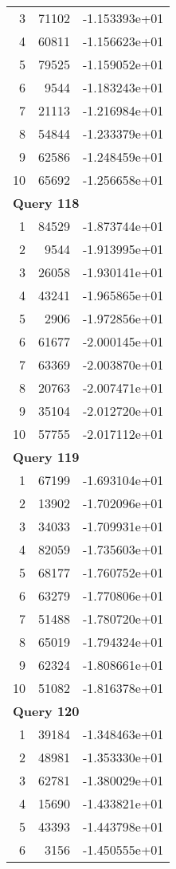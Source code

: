 \begin{longtable}[{p}]{@{}rrp{}@{}}
3 & 71102 & -1.153393e+01 \\
4 & 60811 & -1.156623e+01 \\
5 & 79525 & -1.159052e+01 \\
6 & 9544 & -1.183243e+01 \\
7 & 21113 & -1.216984e+01 \\
8 & 54844 & -1.233379e+01 \\
9 & 62586 & -1.248459e+01 \\
10 & 65692 & -1.256658e+01 \\
\midrule
\multicolumn{3}{l}{\bfseries Query 118} \\
1 & 84529 & -1.873744e+01 \\
2 & 9544 & -1.913995e+01 \\
3 & 26058 & -1.930141e+01 \\
4 & 43241 & -1.965865e+01 \\
5 & 2906 & -1.972856e+01 \\
6 & 61677 & -2.000145e+01 \\
7 & 63369 & -2.003870e+01 \\
8 & 20763 & -2.007471e+01 \\
9 & 35104 & -2.012720e+01 \\
10 & 57755 & -2.017112e+01 \\
\midrule
\multicolumn{3}{l}{\bfseries Query 119} \\
1 & 67199 & -1.693104e+01 \\
2 & 13902 & -1.702096e+01 \\
3 & 34033 & -1.709931e+01 \\
4 & 82059 & -1.735603e+01 \\
5 & 68177 & -1.760752e+01 \\
6 & 63279 & -1.770806e+01 \\
7 & 51488 & -1.780720e+01 \\
8 & 65019 & -1.794324e+01 \\
9 & 62324 & -1.808661e+01 \\
10 & 51082 & -1.816378e+01 \\
\midrule
\multicolumn{3}{l}{\bfseries Query 120} \\
1 & 39184 & -1.348463e+01 \\
2 & 48981 & -1.353330e+01 \\
3 & 62781 & -1.380029e+01 \\
4 & 15690 & -1.433821e+01 \\
5 & 43393 & -1.443798e+01 \\
6 & 3156 & -1.450555e+01 \\

\end{longtable}
